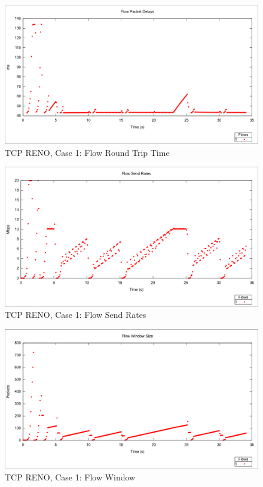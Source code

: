 \begin{figure}[htbp]
    \centering
    \includegraphics[width=\textwidth]{reno1/Flow_RTT.png}
    \caption{TCP RENO, Case 1: Flow Round Trip Time}
\end{figure}

\begin{figure}[htbp]
    \centering
    \includegraphics[width=\textwidth]{reno1/Flow_Send_Rates.png}
    \caption{TCP RENO, Case 1: Flow Send Rates}
\end{figure}

\begin{figure}[htbp]
    \centering
    \includegraphics[width=\textwidth]{reno1/Flow_Window.png}
    \caption{TCP RENO, Case 1: Flow Window}
\end{figure}

